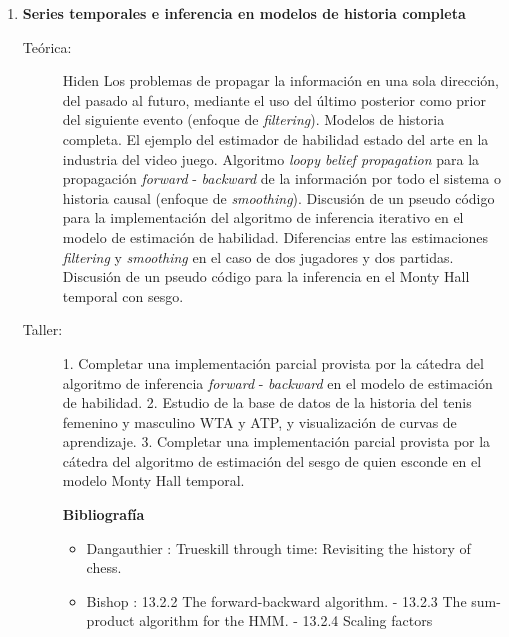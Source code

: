 \documentclass[10pt]{article}
\begin{document}
\begin{enumerate}
\item \textbf{Series temporales e inferencia en modelos de historia completa}
\vspace{-0.15cm}
\begin{description}
\item[Teórica:] Hiden Los problemas de propagar la información en una sola dirección, del pasado al futuro, mediante el uso del último posterior como prior del siguiente evento (enfoque de \emph{filtering}).
Modelos de historia completa.
El ejemplo del estimador de habilidad estado del arte en la industria del video juego.
Algoritmo \emph{loopy belief propagation} para la propagación \emph{forward} - \emph{backward} de la información por todo el sistema o historia causal (enfoque de \emph{smoothing}).
Discusión de un pseudo código para la implementación del algoritmo de inferencia iterativo en el modelo de estimación de habilidad.
Diferencias entre las estimaciones \emph{filtering} y \emph{smoothing} en el caso de dos jugadores y dos partidas.
Discusión de un pseudo código para la inferencia en el Monty Hall temporal con sesgo.
\item[Taller:]
1. Completar una implementación parcial provista por la cátedra del algoritmo de inferencia \emph{forward} - \emph{backward} en el modelo de estimación de habilidad.
2. Estudio de la base de datos de la historia del tenis femenino y masculino WTA y ATP, y visualización de curvas de aprendizaje.
3. Completar una implementación parcial provista por la cátedra del algoritmo de estimación del sesgo de quien esconde en el modelo Monty Hall temporal.
\item[] \textbf{Bibliografía}
\begin{itemize}
\item Dangauthier \cite{dangauthier2008-trueskillThroughTime}: Trueskill through time: Revisiting the history of chess.
\item Bishop \cite{bishop2006-PRML}: 13.2.2 The forward-backward algorithm. - 13.2.3 The sum-product algorithm for the HMM. - 13.2.4 Scaling factors
\end{itemize}
\end{description}



\end{enumerate}
\end{document}

